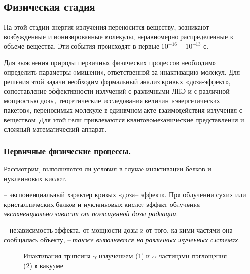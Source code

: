 \documentclass[a4paper, 14pt]{article}
\renewcommand{\emph}[1]{{\color{orange}{\textit{\textbf{#1}}}}}
\begin{document}
\subsection{Физическая стадия}
На этой стадии энергия излучения переносится веществу, возникают возбужденные и ионизированные молекулы, неравномерно распределенные в объеме вещества. Эти события происходят в первые $10^{-16} - 10^{-13}$ с. 

Для выяснения природы первичных физических процессов необходимо определить параметры «мишени», ответственной за инактивацию молекул. Для решения этой задачи необходим формальный анализ кривых «доза-эффект», сопоставление эффективности излучений с различными ЛПЭ и с различной мощностью дозы, теоретические исследования величин «энергетических пакетов», переносимых молекуле в единичном акте взаимодействия излучения с веществом. Для этой цели привлекаются квантовомеханические представления и сложный математический аппарат. %

\subsubsection{Первичные физические процессы.}
Рассмотрим, выполняются ли условия в случае инактивации белков и
нуклеиновых кислот.

\emph{Первое условие} – экспоненциальный характер кривых «доза– эффект». При облучении сухих или кристаллических белков и нуклеиновых кислот эффект облучения \textit{экспоненциально зависит от поглощенной дозы радиации}. 

\emph{Второе условие} – независимость эффекта, от мощности дозы и от того, ка кими частями она сообщалась объекту, – \textit{также выполняется на различных изученных системах}. 

\begin{figure}
    \centering
    \caption{Инактивация трипсина $\gamma$-излучением (1) и $\alpha$-частицами поглощения (2) в вакууме}
    \label{inactivationOfTrypsin}
\end{figure}
\end{document}
